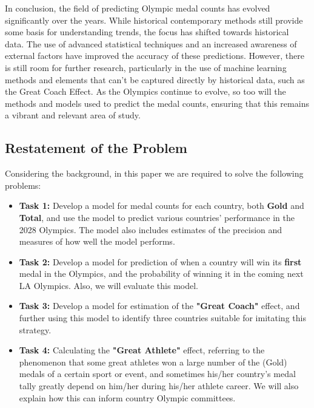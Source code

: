 In conclusion, the field of predicting Olympic medal counts has evolved significantly over the years. While historical contemporary methods still provide some basis for understanding trends, the focus has shifted towards historical data. The use of advanced statistical techniques and an increased awareness of external factors have improved the accuracy of these predictions. 
However, there is still room for further research, particularly in the use of machine learning methods and elements that can't be captured directly by historical data, such as the Great Coach Effect. As the Olympics continue to evolve, so too will the methods and models used to predict the medal counts, ensuring that this remains a vibrant and relevant area of study.

\subsection*{Restatement of the Problem}
Considering the background, in this paper we are required to solve the following problems:

\begin{itemize}
\item{\bf Task 1:} Develop a model for medal counts for each country, both \textbf{Gold} and \textbf{Total}, and use the model to predict various countries' performance in the 2028 Olympics. The model also includes estimates of the precision and measures of how well the model performs.

\item{\bf Task 2:} Develop a model for prediction of when a country will win its \textbf{first} medal in the Olympics, and the probability of winning it in the coming next LA Olympics. Also, we will evaluate this model.

\item{\bf Task 3:} Develop a model for estimation of the \textbf{"Great Coach"} effect, and further using this model to identify three countries suitable for imitating this strategy.

\item{\bf Task 4:} Calculating the \textbf{"Great Athlete"} effect, referring to the phenomenon that some great athletes won a large number of the (Gold) medals of a certain sport or event, and sometimes his/her country's medal tally greatly depend on him/her during his/her athlete career. We will also explain how this can inform country Olympic committees.
\end{itemize}

